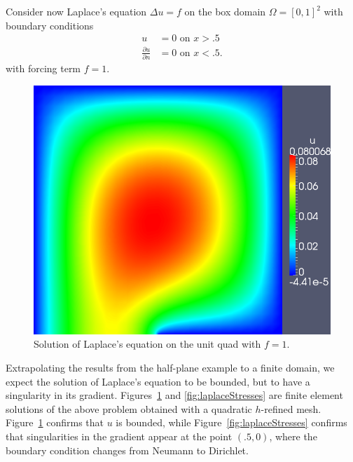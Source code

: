 \documentclass[letterpaper]{article}
\newcommand{\del}{\Delta}
\newcommand{\pd}[2]{\frac{\partial#1}{\partial#2}}
\begin{document}
Consider now Laplace's equation $\del u = f$ on the box domain $\Omega =
[0,1]^2$ with boundary conditions
\begin{align*}
u &= 0 \text{ on } x > .5\\
\pd{u}{n} &= 0 \text{ on } x < .5.
\end{align*}
with forcing term $f=1$.
\begin{figure}[!h]
\centering
\includegraphics[scale=.375]{figs/LaplaceFigs/LaplacePlate.png}
\caption{Solution of Laplace's equation on the unit quad with $f=1$.}
\label{fig:laplace}
\end{figure}
Extrapolating the results from the half-plane example to a finite domain, we
expect the solution of Laplace's equation to be bounded, but to have a
singularity in its gradient.  Figures~\ref{fig:laplace} and
\ref{fig:laplaceStresses} are finite element solutions of the above problem
obtained with a quadratic $h$-refined mesh.  Figure~\ref{fig:laplace} confirms that
$u$ is bounded, while Figure~\ref{fig:laplaceStresses} confirms that
singularities in the gradient appear at the point $(.5,0)$, where the boundary
condition changes from Neumann to Dirichlet.
\end{document}

